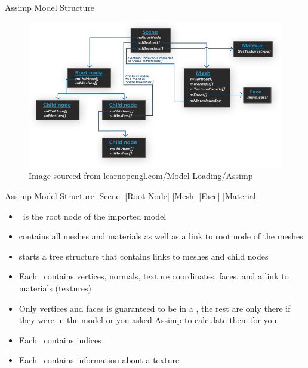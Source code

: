 \documentclass{beamer}
\newcommand{\hrefhand}[2]{\raisebox{-0.4ex}{\HandRight}\,\href{#1}{#2}}
\begin{document}
\begin{frame}[fragile]{Assimp Model Structure}
    \begin{figure}
        \centering
        \includegraphics[width=0.95\linewidth]{images/assimp_structure.png}
        \caption{\footnotesize{Image sourced from \url{learnopengl.com/Model-Loading/Assimp}}}
    \end{figure}
\end{frame}

\begin{frame}[fragile]{Assimp Model Structure}
    |Scene|
    |Root Node|
    |Mesh|
    |Face|
    |Material|
    \begin{itemize}
        \item \hrefhand{https://assimp-docs.readthedocs.io/en/latest/API/API-Documentation.html\#_CPPv47aiScene}{\color{blue}\UseVerb{scene}} is the root node of the imported model
        \item {\color{blue}} contains all meshes and materials as well as a link to root node of the meshes
        \item {\color{blue}} starts a tree structure that contains links to meshes and child nodes
        \item Each \hrefhand{https://assimp-docs.readthedocs.io/en/latest/API/API-Documentation.html\#_CPPv46aiMesh}{\color{blue}\UseVerb{mesh}} contains vertices, normals, texture coordinates, faces, and a link to
              materials (textures)
        \item Only vertices and faces is guaranteed to be in a {\color{blue}}, the rest are only there if
              they were in the model or you asked Assimp to calculate them for you
        \item Each \hrefhand{https://assimp-docs.readthedocs.io/en/latest/API/API-Documentation.html\#_CPPv46aiFace}{\color{blue}\UseVerb{face}} contains indices
        \item Each \hrefhand{https://assimp-docs.readthedocs.io/en/latest/API/API-Documentation.html\#_CPPv410aiMaterial}{\color{blue}\UseVerb{material}} contains information about a texture
    \end{itemize}
\end{frame}
\end{document}
